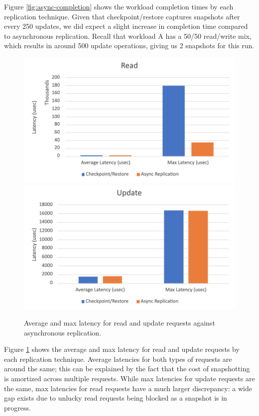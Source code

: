 \documentclass[final]{proc}
\begin{document}
Figure \ref{fig:async-completion} shows the workload completion times by each
replication technique. Given that checkpoint/restore captures snapshots after
every 250 updates, we did expect a slight increase in completion time compared
to asynchronous replication. Recall that workload A has a 50/50 read/write mix,
which results in around 500 update operations, giving us 2 snapshots for this
run.

\begin{figure}
  \centering
  \includegraphics[width=\columnwidth]{async-replication-read.png}
  \includegraphics[width=\columnwidth]{async-replication-update.png}

  \caption{Average and max latency for read and update requests against asynchronous replication.}
  \label{fig:async-latency}
\end{figure}

Figure \ref{fig:async-latency} shows the average and max latency for read and
update requests by each replication technique. Average latencies for both types
of requests are around the same; this can be explained by the fact that the cost
of snapshotting is amortized across multiple requests. While max latencies for
update requests are the same, max latencies for read requests have a much larger
discrepancy: a wide gap exists due to unlucky read requests being blocked as a
snapshot is in progress.
\end{document}
